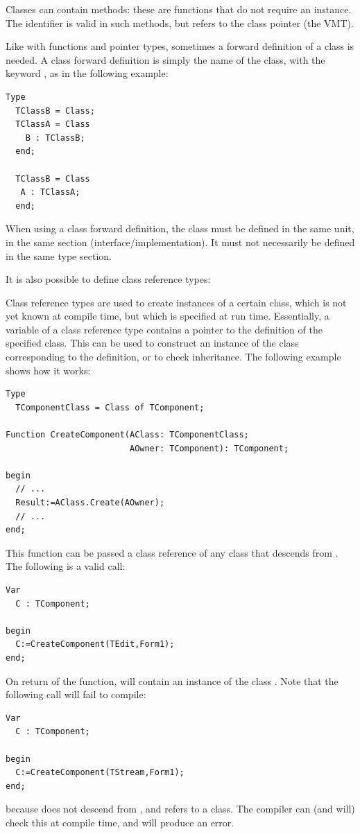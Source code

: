 Classes can contain  methods: these are functions that do not
require an instance. The  identifier is valid in such methods,
but refers to the class pointer (the VMT).

\begin{remark}
Like with functions and pointer types, sometimes a forward definition of a
class is needed. A class forward definition is simply the name of the class,
with the keyword , as in the following example:
\begin{verbatim}
Type
  TClassB = Class;
  TClassA = Class
    B : TClassB;
  end;

  TClassB = Class
   A : TClassA;
  end;
\end{verbatim}
When using a class forward definition, the class must be defined in the same
unit, in the same section (interface/implementation). It must not
necessarily be defined in the same type section.
\end{remark}

It is also possible to define class reference types:

Class reference types are used to create instances of a certain class, which
is not yet known at compile time, but which is specified at run time.
Essentially, a variable of a class reference type contains a pointer to the
definition of the specified class. This can be used to construct an instance
of the class corresponding to the definition, or to check inheritance.
The following example shows how it works:
\begin{verbatim}
Type
  TComponentClass = Class of TComponent;

Function CreateComponent(AClass: TComponentClass;
                         AOwner: TComponent): TComponent;

begin
  // ...
  Result:=AClass.Create(AOwner);
  // ...
end;
\end{verbatim}
This function can be passed a class reference of any class that descends
from . The following is a valid call:
\begin{verbatim}
Var
  C : TComponent;

begin
  C:=CreateComponent(TEdit,Form1);
end;
\end{verbatim}
On return of the  function,  will contain an
instance of the class . Note that the following call will fail to
compile:
\begin{verbatim}
Var
  C : TComponent;

begin
  C:=CreateComponent(TStream,Form1);
end;
\end{verbatim}
because  does not descend from , and
 refers to a  class. The compiler can
(and will) check this at compile time, and will produce an error.


